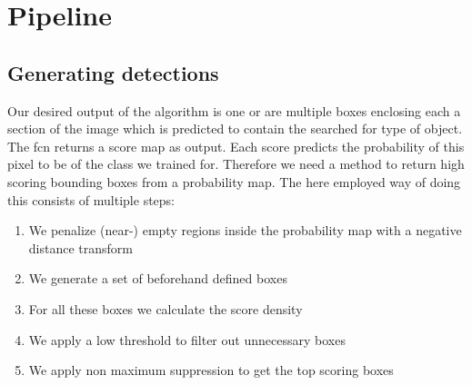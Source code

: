 %
\chapter{Pipeline}
\label{sec:pipeline}

\section{Generating detections}
\label{sec:pipeline:eval}
Our desired output of the algorithm is one or are multiple boxes enclosing each a section of the image which is predicted to contain the searched for type of object. The \gls{fcn} returns a score map as output. Each score predicts the probability of this pixel to be of the class we trained for. Therefore we need a method to return high scoring bounding boxes from a probability map. The here employed way of doing this consists of multiple steps:\\
\begin{enumerate}
    \item We penalize (near-) empty regions inside the probability map with a negative distance transform
    \item We generate a set of beforehand defined boxes
    \item For all these boxes we calculate the score density
    \item We apply a low threshold to filter out unnecessary boxes
    \item We apply non maximum suppression to get the top scoring boxes
\end{enumerate}

